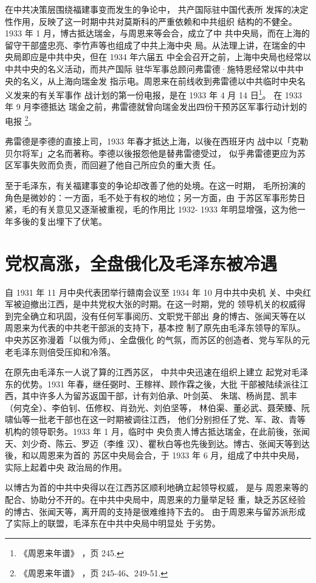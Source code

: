 在中共决策层围绕福建事变而发生的争论中，
共产国际驻中国代表所
发挥的决定性作用，反映了这一时期中共对莫斯科的严重依赖和中共组织
结构的不健全。1933 年 1 月，博古抵达瑞金，与周恩来等会合，成立了中
共中央局，而在上海的留守干部盛忠亮、李竹声等也组成了中共上海中央
局。从法理上讲，在瑞金的中央局即应是中共中央，但在 1934 年六届五
中全会召开之前，上海中央局也经常以中共中央的名义活动，而共产国际
驻华军事总顾问弗雷德·施特恩经常以中共中央的名义，从上海向瑞金发
指示电。周恩来在前线收到弗雷德以中共临时中央名义发来的有关军事作
战计划的第一份电报，是在 1933 年 4 月 14 日\footnote{ 《周恩来年谱》
，页 245.}。 在 1933 年 9 月李德抵达
瑞金之前，弗雷德就曾向瑞金发出四份干预苏区军事行动计划的电报
\footnote{ 《周恩来年谱》
，页 245-46、249-51.}。

弗雷德是李德的直接上司，1933 年春才抵达上海，以後在西班牙内
战中以「克勒贝尔将军」之名而著称。李德以後报怨他是替弗雷德受过，
似乎弗雷德更应为苏区军事失败而负责，而回避了他自己所应负的重大责
任。

至于毛泽东，有关福建事变的争论却改善了他的处境。在这一时期，
毛所扮演的角色是微妙的：一方面，毛不处于有权的地位；另一方面，由
于苏区军事形势日紧，毛的有关意见又逐渐被重视，毛的作用比 1932-
1933 年明显增强，这为他一年多後的复出埋下了伏笔。
 
\section{ 党权高涨，全盘俄化及毛泽东被冷遇}
自 1931 年 11 月中央代表团举行赣南会议至 1934 年 10 月中共中央机
关、中央红军被迫撤出江西，是中共党权大张的时期。在这一时期，党的
领导机关的权威得到完全确立和巩固，没有任何军事阅历、文职党干部出
身的博古、张闻天等在以周恩来为代表的中共老干部派的支持下，基本控
制了原先由毛泽东领导的军队。中央苏区弥漫着「以俄为师」、全盘俄化
的气氛，而苏区的创造者、党与军队的元老毛泽东则倍受压抑和冷落。

在原先由毛泽东一人说了算的江西苏区，
中共中央迅速在组织上建立
起党对毛泽东的优势。1931 年春，继任弼时、王稼祥、顾作霖之後，大批
干部被陆续派往江西，其中许多人为留苏返国干部，计有刘伯承、叶剑英、
朱瑞、杨尚昆、凯丰（何克全）、李伯钊、伍修权、肖劲光、刘伯坚等，
林伯渠、董必武、聂荣臻、阮啸仙等一批老干部也在这一时期被调往江西，
他们分别担任了党、军、政、青等机构的领导职务。1933 年 1 月，临时中
央负责人博古抵达瑞金，在此前後，张闻天、刘少奇、陈云、罗迈（李维
汉）、瞿秋白等也先後到达。博古、张闻天等到达後，和以周恩来为首的
苏区中央局会合，于 1933 年 6 月，组成了中共中央局，实际上起着中央
政治局的作用。

以博古为首的中共中央得以在江西苏区顺利地确立起领导权威，
是与
周恩来等的配合、协助分不开的。在中共中央局中，周恩来的力量举足轻
重，缺乏苏区经验的博古、张闻天等，离开周的支持是很难维持下去的。
由于周恩来与留苏派形成了实际上的联盟，毛泽东在中共中央局中明显处
于劣势。

